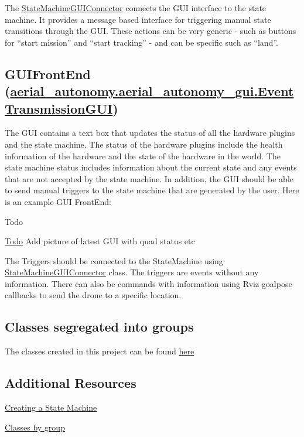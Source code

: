The \hyperlink{classStateMachineGUIConnector}{State\-Machine\-G\-U\-I\-Connector} connects the G\-U\-I interface to the state machine. It provides a message based interface for triggering manual state transitions through the G\-U\-I. These actions can be very generic -\/ such as buttons for “start mission” and “start tracking” -\/ and can be specific such as “land”.

\subsection*{G\-U\-I\-Front\-End (\hyperlink{classaerial__autonomy_1_1aerial__autonomy__gui_1_1EventTransmissionGUI}{aerial\-\_\-autonomy.\-aerial\-\_\-autonomy\-\_\-gui.\-Event\-Transmission\-G\-U\-I})}

The G\-U\-I contains a text box that updates the status of all the hardware plugins and the state machine. The status of the hardware plugins include the health information of the hardware and the state of the hardware in the world. The state machine status includes information about the current state and any events that are not accepted by the state machine. In addition, the G\-U\-I should be able to send manual triggers to the state machine that are generated by the user. Here is an example G\-U\-I Front\-End\-:

\begin{DoxyRefDesc}{Todo}
\item[\hyperlink{todo__todo000014}{Todo}]Add picture of latest G\-U\-I with quad status etc\end{DoxyRefDesc}


The Triggers should be connected to the {\ttfamily State\-Machine} using {\ttfamily \hyperlink{classStateMachineGUIConnector}{State\-Machine\-G\-U\-I\-Connector}} class. The triggers are events without any information. There can also be commands with information using {\ttfamily Rviz} goalpose callbacks to send the drone to a specific location.

\subsection*{Classes segregated into groups}

The classes created in this project can be found \hyperlink{md_markdown_scripts_class_groups}{here}

\subsection*{Additional Resources}


\begin{DoxyItemize}
\item \hyperlink{md_markdown_scripts_creating_state_machine}{Creating a State Machine}
\item \hyperlink{md_markdown_scripts_class_groups}{Classes by group} 
\end{DoxyItemize}